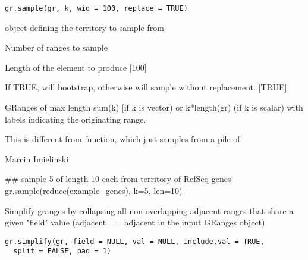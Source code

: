 \documentclass[a4paper]{book}
\begin{document}
%
\begin{Usage}
\begin{verbatim}
gr.sample(gr, k, wid = 100, replace = TRUE)
\end{verbatim}
\end{Usage}
%
\begin{Arguments}
\begin{ldescription}
\item[\code{gr}]  object defining the territory to sample from

\item[\code{k}] Number of ranges to sample

\item[\code{wid}] Length of the  element to produce [100]

\item[\code{replace}] If TRUE, will bootstrap, otherwise will sample without replacement. [TRUE]
\end{ldescription}
\end{Arguments}
%
\begin{Value}
GRanges of max length sum(k) [if k is vector) or k*length(gr) (if k is scalar) with labels indicating the originating range.
\end{Value}
%
\begin{Note}\relax
This is different from  function, which just samples from a pile of 
\end{Note}
%
\begin{Author}\relax
Marcin Imielinski
\end{Author}
%
\begin{Examples}
\begin{ExampleCode}
## sample 5  of length 10 each from territory of RefSeq genes
gr.sample(reduce(example_genes), k=5, len=10)
\end{ExampleCode}
\end{Examples}
%
\begin{Description}\relax
Simplify granges by collapsing all non-overlapping adjacent ranges that share a given "field" value
(adjacent == adjacent in the input GRanges object)
\end{Description}
%
\begin{Usage}
\begin{verbatim}
gr.simplify(gr, field = NULL, val = NULL, include.val = TRUE,
  split = FALSE, pad = 1)
\end{verbatim}
\end{Usage}
\end{document}
